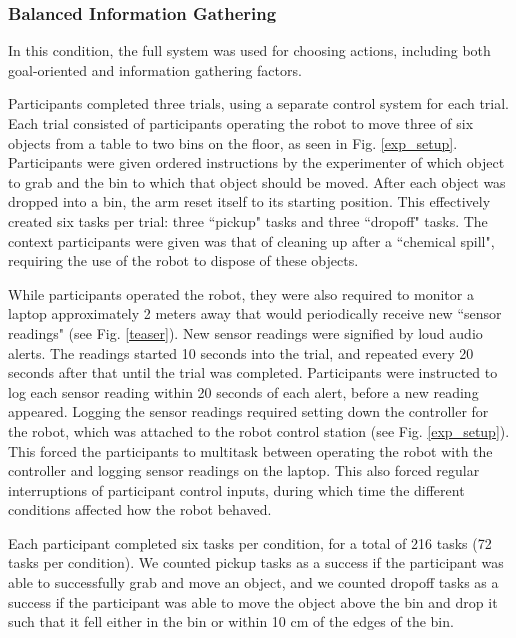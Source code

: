 \documentclass[conference]{IEEEtran}
\begin{document}
\subsubsection{Balanced Information Gathering}
In this condition, the full system was used for choosing actions, including both goal-oriented and information gathering factors.

Participants completed three trials, using a separate control system for each trial. Each trial consisted of participants operating the robot to move three of six objects from a table to two bins on the floor, as seen in Fig. \ref{exp_setup}. Participants were given ordered instructions by the experimenter of which object to grab and the bin to which that object should be moved. After each object was dropped into a bin, the arm reset itself to its starting position. This effectively created six tasks per trial: three ``pickup" tasks and three ``dropoff" tasks. The context participants were given was that of cleaning up after a ``chemical spill", requiring the use of the robot to dispose of these objects.

While participants operated the robot, they were also required to monitor a laptop approximately 2 meters away that would periodically receive new ``sensor readings" (see Fig. \ref{teaser}). New sensor readings were signified by loud audio alerts. The readings started 10 seconds into the trial, and repeated every 20 seconds after that until the trial was completed. Participants were instructed to log each sensor reading within 20 seconds of each alert, before a new reading appeared. Logging the sensor readings required setting down the controller for the robot, which was attached to the robot control station (see Fig. \ref{exp_setup}). This forced the participants to multitask between operating the robot with the controller and logging sensor readings on the laptop. This also forced regular interruptions of participant control inputs, during which time the different conditions affected how the robot behaved. 

Each participant completed six tasks per condition, for a total of 216 tasks (72 tasks per condition). We counted pickup tasks as a success if the participant was able to successfully grab and move an object, and we counted dropoff tasks as a success if the participant was able to move the object above the bin and drop it such that it fell either in the bin or within 10 cm of the edges of the bin.
\end{document}
